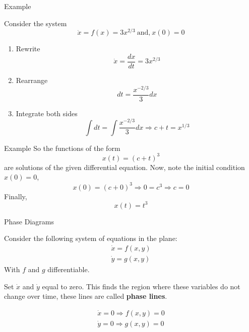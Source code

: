 \documentclass[aspectratio=169, handout]{beamer}
\begin{document}
\begin{frame}{Example}

Consider the system \[\dot{x}=f(x)=3x^{2/3}\ \text{and,}\ x(0)=0\]

\begin{enumerate}
    \item<2-> Rewrite \[\dot{x}=\frac{dx}{dt}=3x^{2/3}\]
    \item<3-> Rearrange \[dt=\frac{x^{-2/3}}{3}dx\]
    \item<4-> Integrate both sides \[\int dt = \int \frac{x^{-2/3}}{3}dx\Rightarrow c+t=x^{1/3}\]
\end{enumerate}
    
\end{frame}

\begin{frame}{Example}
    So the functions of the form \[x(t)=(c+t)^3\] are solutions of the given differential equation. Now, note the initial condition $x(0)=0$,
    \[x(0)=(c+0)^3\Rightarrow 0=c^3\Rightarrow c=0\]
    Finally, \[x(t)=t^3\]
\end{frame}

\begin{frame}{Phase Diagrams}

    Consider the following system of equations in the plane:
    \begin{align*}
        \dot{x}=f(x,y)\\
        \dot{y}=g(x,y)
    \end{align*}
    With $f$ and $g$ differentiable.
    
    Set $\dot{x}$ and $\dot{y}$ equal to zero. This finds the region where these variables do not change over time, these lines are called \textbf{phase lines}.
    
    \begin{align*}
        \dot{x}=0\Rightarrow f(x,y)=0\\
        \dot{y}=0\Rightarrow g(x,y)=0
    \end{align*}
    
\end{frame}
\end{document}
